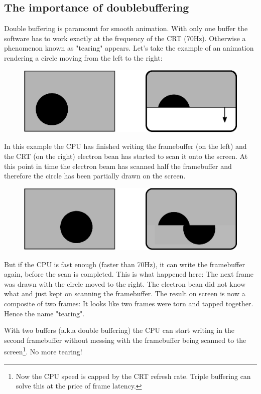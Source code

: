 \documentclass[book.tex]{subfiles}
\begin{document}
\subsection{The importance of doublebuffering}
Double buffering is paramount for smooth animation. With only one buffer the software has to work exactly at the frequency of the CRT (70Hz). Otherwise a phenomenon known as "tearing" appears. Let's take the example of an animation rendering a circle moving from the left to the right:
\par
\begin{figure}[H]
\centering
\includegraphics[width=\textwidth]{imgs/drawings/doublebuffer_before.eps}
\end{figure}
\par
In this example the CPU has finished writing the framebuffer (on the left) and the CRT (on the right) electron bean has started to scan it onto the screen. At this point in time the electron beam has scanned half the framebuffer and therefore the circle has been partially drawn on the screen.
\par
\begin{figure}[H]
\centering
\includegraphics[width=\textwidth]{imgs/drawings/doublebuffer_after.eps}
\end{figure}
\par
But if the CPU is fast enough (faster than 70Hz), it can write the framebuffer again, before the scan is completed. This is what happened here: The next frame was drawn with the circle moved to the right. The electron bean did not know what and just kept on scanning the framebuffer. The result on screen is now a composite of two frames: It looks like two frames were torn and tapped together. Hence the name "tearing".\\
\par
With two buffers (a.k.a double buffering) the CPU can start writing in the second framebuffer without messing with the framebuffer being scanned to the screen\footnote{Now the CPU speed is capped by the CRT refresh rate. Triple buffering can solve this at the price of frame latency.}. No more tearing!
\end{document}
